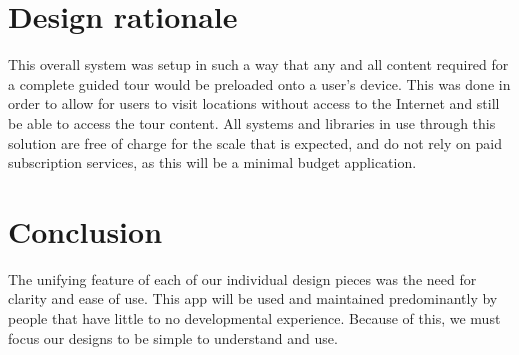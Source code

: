 \documentclass[letterpaper, 10pt,titlepage]{article}
\begin{document}
\section{Design rationale}
This overall system was setup in such a way that any and all content required for a complete guided tour would be pre\-loaded onto a user's device. This was done in order to allow for users to visit locations without access to the Internet and still be able to access the tour content. All systems and libraries in use through this solution are free of charge for the scale that is expected, and do not rely on paid subscription services, as this will be a minimal budget application. 



\section{Conclusion}
The unifying feature of each of our individual design pieces was the need for clarity and ease of use. This app will be used and maintained predominantly by people that have little to no developmental experience. Because of this, we must focus our designs to be simple to understand and use. 
\end{document}
